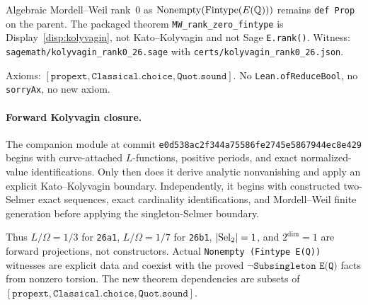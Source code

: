 \begin{honesty}
Algebraic Mordell--Weil rank~$0$ as
$\mathrm{Nonempty}(\mathrm{Fintype}(E(\mathbb{Q})))$ remains
\texttt{def Prop} on the parent. The packaged theorem
\texttt{MW\_rank\_zero\_fintype} is Display~\ref{disp:kolyvagin},
not Kato--Kolyvagin and not Sage \texttt{E.rank()}. Witness:
\texttt{sagemath/kolyvagin\_rank0\_26.sage} with
\texttt{certs/kolyvagin\_rank0\_26.json}.
\end{honesty}

Axioms: $[\mathtt{propext},\mathtt{Classical.choice},\mathtt{Quot.sound}]$.
No \texttt{Lean.ofReduceBool}, no \texttt{sorryAx}, no new axiom.

\paragraph{Forward Kolyvagin closure.}
The companion module
 at commit
\texttt{e0d538ac2f344a75586fe2745e5867944ec8e429} begins with
curve-attached $L$-functions, positive periods, and exact normalized-value
identifications. Only then does it derive analytic nonvanishing and apply an
explicit Kato--Kolyvagin boundary. Independently, it begins with constructed
two-Selmer exact sequences, exact cardinality identifications, and
Mordell--Weil finite generation before applying the singleton-Selmer
boundary.

Thus $L/\Omega=1/3$ for \texttt{26a1}, $L/\Omega=1/7$ for
\texttt{26b1}, $\lvert\mathrm{Sel}_2\rvert=1$, and $2^{\dim}=1$ are forward
projections, not constructors. Actual
\texttt{Nonempty (Fintype E(Q))} witnesses are explicit data and coexist
with the proved $\neg\texttt{Subsingleton E(Q)}$ facts from nonzero torsion.
The new theorem dependencies are subsets of
$[\mathtt{propext},\mathtt{Classical.choice},\mathtt{Quot.sound}]$.

